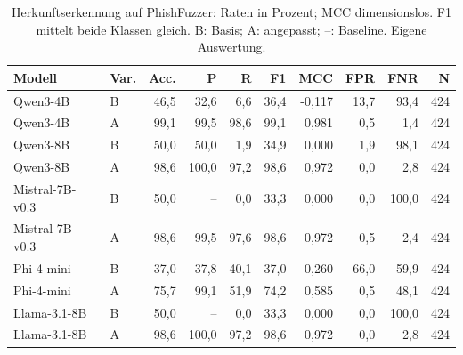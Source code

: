 \begin{table}[htbp]
\centering\scriptsize
\caption{Herkunftserkennung auf PhishFuzzer: Raten in Prozent; MCC dimensionslos. F1 mittelt beide Klassen gleich. B: Basis; A: angepasst; –: Baseline. Eigene Auswertung.}
\label{tab:result-origin-0}
\begin{tabular}{llrrrrrrrr}
\toprule
Modell & Var. & Acc. & P & R & F1 & MCC & FPR & FNR & N \\
\midrule
Qwen3-4B & B & 46{,}5 & 32{,}6 & 6{,}6 & 36{,}4 & -0{,}117 & 13{,}7 & 93{,}4 & 424 \\
Qwen3-4B & A & 99{,}1 & 99{,}5 & 98{,}6 & 99{,}1 & 0{,}981 & 0{,}5 & 1{,}4 & 424 \\
Qwen3-8B & B & 50{,}0 & 50{,}0 & 1{,}9 & 34{,}9 & 0{,}000 & 1{,}9 & 98{,}1 & 424 \\
Qwen3-8B & A & 98{,}6 & 100{,}0 & 97{,}2 & 98{,}6 & 0{,}972 & 0{,}0 & 2{,}8 & 424 \\
Mistral-7B-v0.3 & B & 50{,}0 & – & 0{,}0 & 33{,}3 & 0{,}000 & 0{,}0 & 100{,}0 & 424 \\
Mistral-7B-v0.3 & A & 98{,}6 & 99{,}5 & 97{,}6 & 98{,}6 & 0{,}972 & 0{,}5 & 2{,}4 & 424 \\
Phi-4-mini & B & 37{,}0 & 37{,}8 & 40{,}1 & 37{,}0 & -0{,}260 & 66{,}0 & 59{,}9 & 424 \\
Phi-4-mini & A & 75{,}7 & 99{,}1 & 51{,}9 & 74{,}2 & 0{,}585 & 0{,}5 & 48{,}1 & 424 \\
Llama-3.1-8B & B & 50{,}0 & – & 0{,}0 & 33{,}3 & 0{,}000 & 0{,}0 & 100{,}0 & 424 \\
Llama-3.1-8B & A & 98{,}6 & 100{,}0 & 97{,}2 & 98{,}6 & 0{,}972 & 0{,}0 & 2{,}8 & 424 \\
\bottomrule
\end{tabular}
\end{table}


